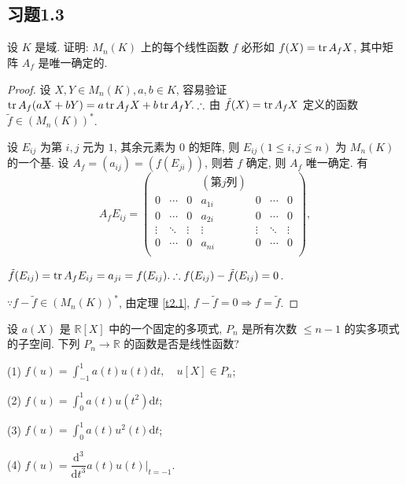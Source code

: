 \documentclass[color=black,device=normal,lang=cn,mode=geye]{elegantnote}
\begin{document}
\subsection{习题1.3}
\begin{exercise}\label{ex3.1}
    设 $K$ 是域. 证明: $M_n(K)$ 上的每个线性函数 $f$ 必形如 $f(X)=\operatorname{tr} A_fX$, 其中矩阵 $A_f$ 是唯一确定的.
\end{exercise}
\begin{proof}
    设 $X,Y\in M_n(K),a,b\in K$, 容易验证 $\operatorname{tr} A_f(aX+bY)=a\operatorname{tr} A_fX+b\operatorname{tr} A_fY.\therefore$ 由 $\tilde{f}(X)=\operatorname{tr} A_fX$ 定义的函数 $\tilde{f}\in(M_n(K))^*$.

    设 $E_{ij}$ 为第 $i,j$ 元为 $1$, 其余元素为 $0$ 的矩阵, 则 $E_{ij}(1\leq i,j\leq n)$ 为 $M_n(K)$ 的一个基. 设 $A_f=(a_{ij})=(f(E_{ji}))$, 则若 $f$ 确定, 则 $A_f$ 唯一确定. 有
    \[A_fE_{ij}=\begin{pmatrix}
               &        &        & (\text{第}j\text{列}) \\
        0      & \cdots & 0      & a_{1i} & 0      & \cdots & 0 \\
        0      & \cdots & 0      & a_{2i} & 0      & \cdots & 0 \\
        \vdots & \ddots & \vdots & \vdots & \vdots & \ddots & \vdots \\
        0      & \cdots & 0      & a_{ni} & 0      & \cdots & 0 \\
    \end{pmatrix},\]

    $\tilde{f}(E_{ij})=\operatorname{tr} A_fE_{ij}=a_{ji}=f(E_{ij}).\therefore f(E_{ij})-\tilde{f}(E_{ij})=0$.
    
    $\because f-\tilde{f}\in(M_n(K))^*$, 由定理 \ref{t2.1}, $f-\tilde{f}=0\Rightarrow f=\tilde{f}$.
\end{proof}
\begin{exercise}%
    设 $a(X)$ 是 $\mathbb{R}[X]$ 中的一个固定的多项式, $P_n$ 是所有次数 $\leq n-1$ 的实多项式的子空间. 下列 $P_n\to\mathbb{R}$ 的函数是否是线性函数?

    (1) $f(u)=\int_{-1}^1a(t)u(t)\mathrm{d}t,\quad u[X]\in P_n$;

    (2) $f(u)=\int_0^1a(t)u(t^2)\mathrm{d}t$;

    (3) $f(u)=\int_0^1a(t)u^2(t)\mathrm{d}t$;

    (4) $f(u)=\dfrac{\mathrm{d}^3}{\mathrm{d}t^3}a(t)u(t)\Big|_{t=-1}$.
\end{exercise}
\end{document}
